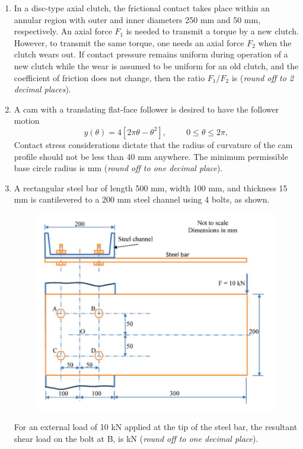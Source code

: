 \documentclass[12pt,onecolumn]{article}
\begin{document}
\begin{enumerate}
    \item In a disc-type axial clutch, the frictional contact takes place within an annular region with outer and inner diameters 250 mm and 50 mm, respectively. An axial force $F_1$ is needed to transmit a torque by a new clutch. However, to transmit the same torque, one needs an axial force $F_2$ when the clutch wears out. If contact pressure remains uniform during operation of a new clutch while the wear is assumed to be uniform for an old clutch, and the coefficient of friction does not change, then the ratio $F_1/F_2$ is \underline{\hspace{2cm}} (\textit{round off to 2 decimal places}).

    \item A cam with a translating flat-face follower is desired to have the follower motion
          \[
              y(\theta) = 4 \left[ 2\pi\theta - \theta^2 \right],\hspace{1cm} 0 \le \theta \le 2\pi,
          \]
          Contact stress considerations dictate that the radius of curvature of the cam profile should not be less than 40 mm anywhere. The minimum permissible base circle radius is \underline{\hspace{2cm}} mm (\textit{round off to one decimal place}).

    \item A rectangular steel bar of length 500 mm, width 100 mm, and thickness 15 mm is cantilevered to a 200 mm steel channel using 4 bolts, as shown.
          \begin{figure}[H]
              \centering
              \includegraphics[scale=0.5]{q39}
              \label{fig:q39}
          \end{figure}
          For an external load of 10 kN applied at the tip of the steel bar, the resultant shear load on the bolt at B, is \underline{\hspace{2cm}} kN (\textit{round off to one decimal place}).


\end{enumerate}
\end{document}
